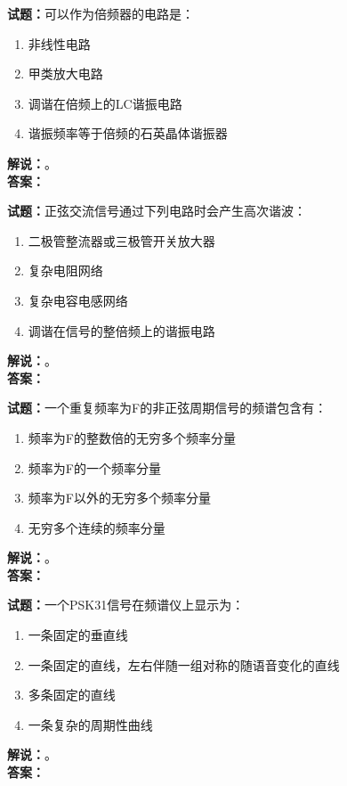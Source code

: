 \documentclass{ctexbook}
\begin{document}
\noindent\textbf{试题：}可以作为倍频器的电路是：
\begin{enumerate}[leftmargin=3em]
  \item 非线性电路
  \item 甲类放大电路
  \item 调谐在倍频上的LC谐振电路
  \item 谐振频率等于倍频的石英晶体谐振器
\end{enumerate}
\noindent\textbf{解说：}\textbf{}。\\\noindent\textbf{答案：}

\vspace{\baselineskip}

\noindent\textbf{试题：}正弦交流信号通过下列电路时会产生高次谐波：
\begin{enumerate}[leftmargin=3em]
  \item 二极管整流器或三极管开关放大器
  \item 复杂电阻网络
  \item 复杂电容电感网络
  \item 调谐在信号的整倍频上的谐振电路
\end{enumerate}
\noindent\textbf{解说：}\textbf{}。\\\noindent\textbf{答案：}

\vspace{\baselineskip}

\noindent\textbf{试题：}一个重复频率为F的非正弦周期信号的频谱包含有：
\begin{enumerate}[leftmargin=3em]
  \item 频率为F的整数倍的无穷多个频率分量
  \item 频率为F的一个频率分量
  \item 频率为F以外的无穷多个频率分量
  \item 无穷多个连续的频率分量
\end{enumerate}
\noindent\textbf{解说：}\textbf{}。\\\noindent\textbf{答案：}

\vspace{\baselineskip}

\noindent\textbf{试题：}一个PSK31信号在频谱仪上显示为：
\begin{enumerate}[leftmargin=3em]
  \item 一条固定的垂直线
  \item 一条固定的直线，左右伴随一组对称的随语音变化的直线
  \item 多条固定的直线
  \item 一条复杂的周期性曲线
\end{enumerate}
\noindent\textbf{解说：}\textbf{}。\\\noindent\textbf{答案：}
\end{document}

